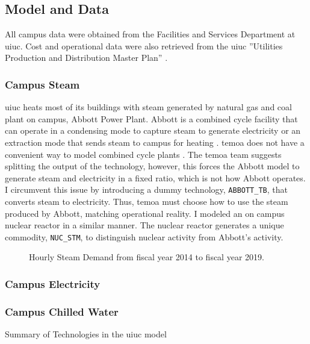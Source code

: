 \subsection{Model and Data}
All campus data were obtained from the Facilities and Services Department at \gls{uiuc}.
Cost and operational data were also retrieved from the \gls{uiuc} ''Utilities
Production and Distribution Master Plan'' \cite{affiliated_engineers_inc_utilities_2015}.

\subsubsection{Campus Steam}
\gls{uiuc} heats most of its buildings with steam generated by natural gas and
coal plant on campus, Abbott Power Plant. Abbott is a combined cycle facility that
can operate in a condensing mode to capture steam to generate electricity or an
extraction mode that sends steam to campus for heating
\cite{affiliated_engineers_inc_utilities_2015}. \gls{temoa} does not have a
convenient way to model combined cycle plants \cite{decarolis_temoa_2010}. The
\gls{temoa} team suggests splitting the output of the technology, however, this
forces the Abbott model to generate steam and electricity in a fixed ratio, which
is not how Abbott operates. I circumvent this issue by introducing a dummy technology,
\texttt{ABBOTT\_TB}, that converts steam to electricity. Thus, \gls{temoa} must
choose how to use the steam produced by Abbott, matching operational reality.
I modeled an on campus nuclear reactor in a similar manner. The nuclear reactor
generates a unique commodity, \texttt{NUC\_STM}, to distinguish nuclear activity
from Abbott's activity.

\begin{figure}[H]
  \centering
  \resizebox{0.8\columnwidth}{!}{}
  \caption{Hourly Steam Demand from fiscal year 2014 to fiscal year 2019.}
  \label{fig:historical-steam}
\end{figure}

\subsubsection{Campus Electricity}

\subsubsection{Campus Chilled Water}

\begin{table}[H]
  \centering
  \caption{Summary of Technologies in the \gls{uiuc} model}
  \label{tab:uiuc-tech}
  \resizebox{\textwidth}{!}{
  
  } %
\end{table}
